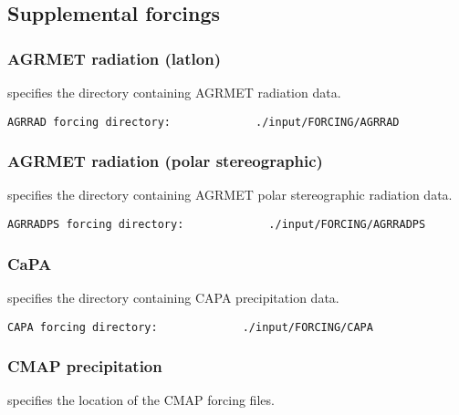 
 \subsection{Supplemental forcings} \label{ssec:suppforcings}
 

 
 \subsubsection{AGRMET radiation (latlon)} \label{sssec:supp_agrrad}
  specifies the directory containing
 AGRMET radiation data.
 

 \begin{Verbatim}[frame=single]
AGRRAD forcing directory:             ./input/FORCING/AGRRAD
 \end{Verbatim}

 
 \subsubsection{AGRMET radiation (polar stereographic)}
 \label{sssec:supp_agrradps}
 

 
  specifies the directory containing
 AGRMET polar stereographic radiation data.
 

 \begin{Verbatim}[frame=single]
AGRRADPS forcing directory:             ./input/FORCING/AGRRADPS
 \end{Verbatim}

 
 
 \subsubsection{CaPA} \label{sssec:supp_capa}
  specifies the directory containing
 CAPA precipitation data.
 

 \begin{Verbatim}[frame=single]
CAPA forcing directory:             ./input/FORCING/CAPA
 \end{Verbatim}
 

 
 \subsubsection{CMAP precipitation} \label{sssec:supp_cmap}
 

 
  specifies the location of the
 CMAP forcing files.
 

